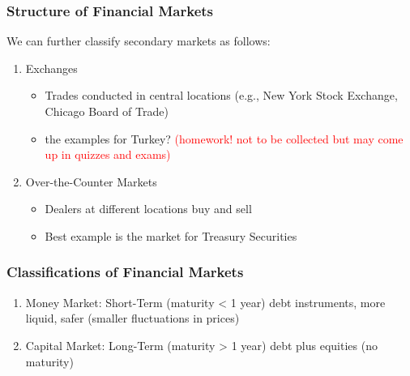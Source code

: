 \documentclass{beamer}
\begin{document}
\begin{frame}
\frametitle{Structure of Financial Markets }

We can further classify secondary markets as follows:
\vspace{\baselineskip}

\begin{enumerate}
\item Exchanges
\smallskip
\begin{itemize}
\item Trades conducted in central locations (e.g., New York Stock Exchange, Chicago Board of Trade)
\item the examples for Turkey? \textcolor{red}{(homework! not to be collected but may come up in quizzes and exams)}
\end{itemize}
\vspace{\baselineskip}

\item Over-the-Counter Markets
\smallskip
\begin{itemize}
\item Dealers at different locations buy and sell
\item Best example is the market for Treasury Securities
\end{itemize}
\end{enumerate}
\end{frame}

\begin{frame}
\frametitle{Classifications of Financial Markets}

\begin{enumerate}
\item Money Market: Short-Term (maturity < 1 year) debt instruments, more liquid, safer (smaller fluctuations in prices)
\smallskip

\item Capital Market: Long-Term (maturity > 1 year) debt plus equities (no maturity)

\end{enumerate}
\end{frame}

\end{document}

